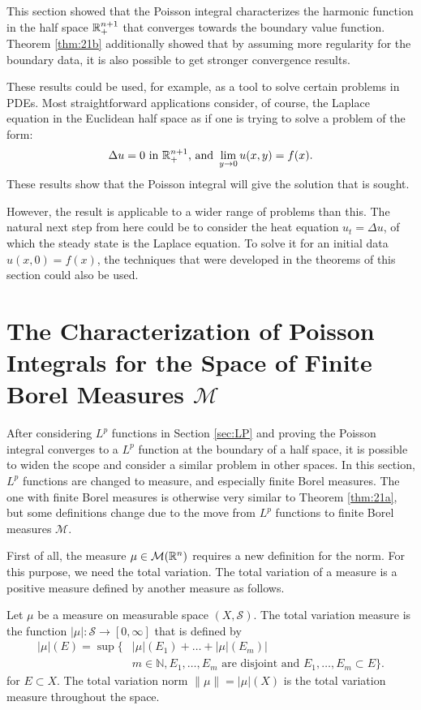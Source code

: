 This section showed that the Poisson integral characterizes the harmonic function in the half space $\mathbb R^{n+1}_+$ that converges towards the boundary value function. Theorem \ref{thm:21b} additionally showed that by assuming more regularity for the boundary data, it is also possible to get stronger convergence results.

These results could be used, for example, as a tool to solve certain problems in PDEs. Most straightforward applications consider, of course, the Laplace equation in the Euclidean half space as if one is trying to solve a problem of the form:
\begin{equation*}
    \Delta u=0\text{ in }\mathbb R^{n+1}_+\text{, and }\lim_{y\rightarrow0}u(x,y)=f(x).
\end{equation*}
These results show that the Poisson integral will give the solution that is sought.

However, the result is applicable to a wider range of problems than this. The natural next step from here could be to consider the heat equation $u_t=\Delta u$, of which the steady state is the Laplace equation. To solve it for an initial data $u(x,0)=f(x)$, the techniques that were developed in the theorems of this section could also be used.

\section{The Characterization of Poisson Integrals for the Space of Finite Borel Measures $\mathcal M$}

After considering $L^p$ functions in Section \ref{sec:LP} and proving the Poisson integral converges to a $L^p$ function at the boundary of a half space, it is possible to widen the scope and consider a similar problem in other spaces. In this section, $L^p$ functions are changed to measure, and especially finite Borel measures. The one with finite Borel measures is otherwise very similar to Theorem \ref{thm:21a}, but some definitions change due to the move from $L^p$ functions to finite Borel measures $\mathcal M$.

First of all, the measure $\mu\in\mathcal M(\mathbb R^{n})$ requires a new definition for the norm. For this purpose, we need the total variation. The total variation of a measure is a positive measure defined by another measure as follows. 

\begin{definition}
    Let $\mu$ be a measure on measurable space $(X,\mathcal{S})$. The total variation measure is the function $|\mu|:\mathcal{S}\rightarrow [0,\infty]$ that is defined by
    \begin{align*}
        |\mu|(E) =\sup\{&|\mu|(E_1)+\ldots+|\mu|(E_m)|\\
        &m\in\mathbb{N}, E_1,\ldots,E_m\text{ are disjoint and }E_1,\ldots,E_m\subset E\}.
    \end{align*}
    for $E\subset X$. The total variation norm $\|\mu\|=|\mu|(X)$ is the total variation measure throughout the space.
\end{definition}

